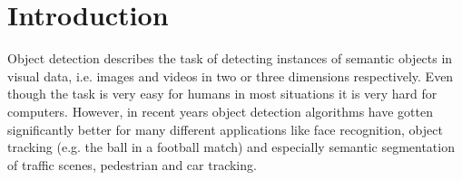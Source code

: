 \chapter{Introduction}
\label{chap:introduction}

Object detection describes the task of detecting instances of semantic objects in visual data, i.e. images and videos in two or three dimensions respectively. Even though the task is very easy for humans in most situations it is very hard for computers. However, in recent years object detection algorithms have gotten significantly better for many different applications like face recognition, object tracking (e.g. the ball in a football match) and especially semantic segmentation of traffic scenes, pedestrian and car tracking. 

